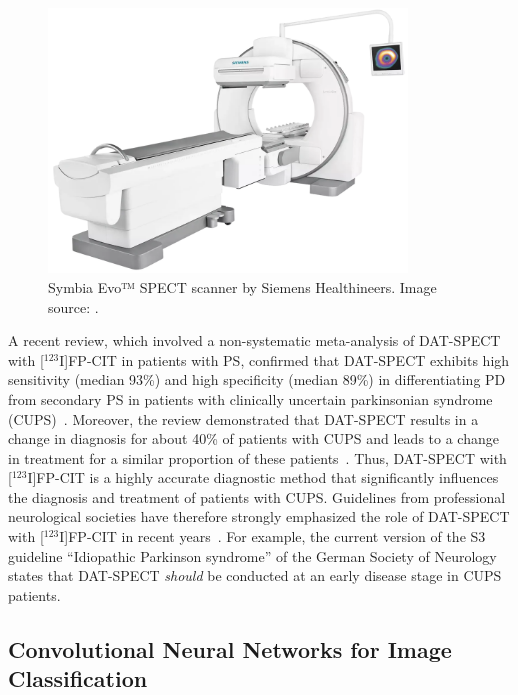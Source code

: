 \begin{figure}[ht]
  \centering
  \includegraphics[width=0.85\textwidth]{content/figures/siemens-healthineers_MI_symbia-evo.png}
  \caption{Symbia Evo™ SPECT scanner by Siemens Healthineers. Image source: \cite{SymbiaEvo_siemens}.} 
  \label{fig:siemens-healthineers_MI_symbia-evo}
\end{figure}

A recent review, which involved a non-systematic meta-analysis of DAT-SPECT with [$^{123}$I]FP-CIT in patients with PS, 
confirmed that DAT-SPECT exhibits high sensitivity (median 93\%) and high specificity (median 89\%) 
in differentiating PD from secondary PS in patients with 
clinically uncertain parkinsonian syndrome (CUPS)~\citep{Buchert2019-ya}.
Moreover, the review demonstrated that DAT-SPECT results in a change in diagnosis for about 40\% of patients with CUPS
and leads to a change in treatment for a similar proportion of these patients~\citep{Buchert2019-ya}. 
Thus, DAT-SPECT with [$^{123}$I]FP-CIT is a highly accurate diagnostic method
that significantly influences the diagnosis and treatment of patients with CUPS.
Guidelines from professional neurological societies have therefore strongly emphasized 
the role of DAT-SPECT with [$^{123}$I]FP-CIT in recent years~\citep{Tatsch2013}.
For example, the current version of the S3 guideline “Idiopathic Parkinson syndrome” of the 
German Society of Neurology states that DAT-SPECT \textit{should} be conducted at an early disease stage in CUPS patients.

\subsection{Convolutional Neural Networks for Image Classification}
\label{subsec:randfors}

